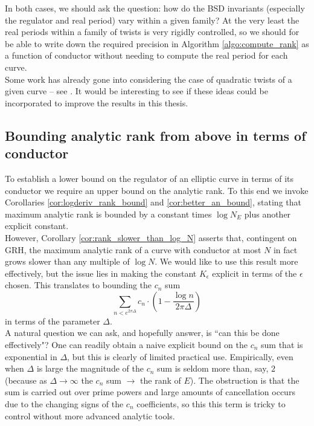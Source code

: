In both cases, we should ask the question: how do the BSD invariants (especially the regulator and real period) vary within a given family? At the very least the real periods within a family of twists is very rigidly controlled, so we should for be able to write down the required precision in Algorithm \ref{algo:compute_rank} as a function of conductor without needing to compute the real period for each curve. \\

Some work has already gone into considering the case of quadratic twists of a given curve -- see \cite{DeRo-2007}. It would be interesting to see if these ideas could be incorporated to improve the results in this thesis.

\subsection{Bounding analytic rank from above in terms of conductor}

To establish a lower bound on the regulator of an elliptic curve in terms of its conductor we require an upper bound on the analytic rank. To this end we invoke Corollaries \ref{cor:logderiv_rank_bound} and \ref{cor:better_an_bound}, stating that maximum analytic rank is bounded by a constant times $\log N_E$ plus another explicit constant. \\

However, Corollary \ref{cor:rank_slower_than_log_N} asserts that, contingent on GRH, the maximum analytic rank of a curve with conductor at most $N$ in fact grows slower than any multiple of $\log N$. We would like to use this result more effectively, but the issue lies in making the constant $K_\epsilon$ explicit in terms of the $\epsilon$ chosen. This translates to bounding the $c_n$ sum
\begin{equation}
\sum_{n < e^{2\pi \Delta}} c_n \cdot \left(1-\frac{\log n}{2\pi \Delta}\right)
\end{equation}
in terms of the parameter $\Delta$. \\

A natural question we can ask, and hopefully answer, is ``can this be done effectively"? One can readily obtain a naive explicit bound on the $c_n$ sum that is exponential in $\Delta$, but this is clearly of limited practical use. Empirically, even when $\Delta$ is large the magnitude of the $c_n$ sum is seldom more than, say, $2$ (because as $\Delta \to \infty$ the $c_n$ sum $\to$ the rank of $E$). The obstruction is that the sum is carried out over prime powers and large amounts of cancellation occurs due to the changing signs of the $c_n$ coefficients, so this this term is tricky to control without more advanced analytic tools.  \\

